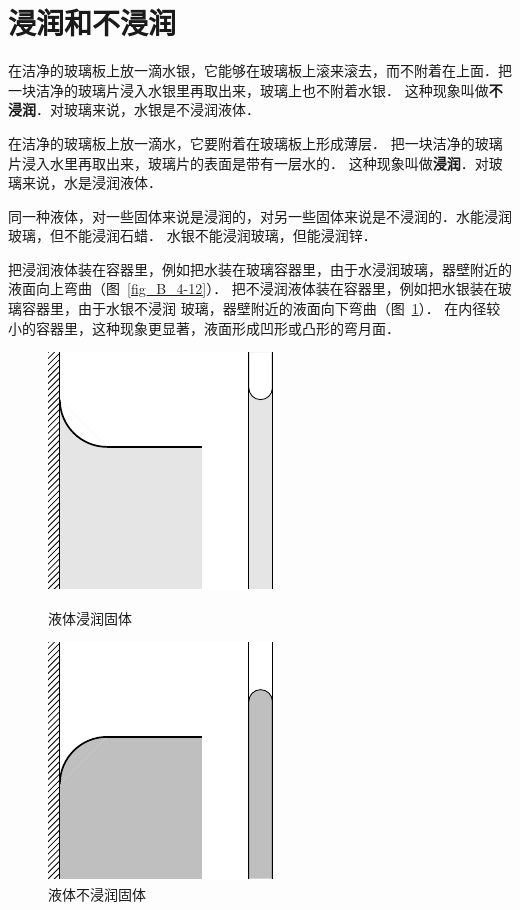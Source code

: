 \section{浸润和不浸润}
在洁净的玻璃板上放一滴水银，它能够在玻璃板上滚来滚去，而不附着在上面．把一块洁净的玻璃片浸入水银里再取出来，玻璃上也不附着水银．
这种现象叫做\textbf{不浸润}．对玻璃来说，水银是不浸润液体．

在洁净的玻璃板上放一滴水，它要附着在玻璃板上形成薄层．
把一块洁净的玻璃片浸入水里再取出来，玻璃片的表面是带有一层水的．
这种现象叫做\textbf{浸润}．对玻璃来说，水是浸润液体．

同一种液体，对一些固体来说是浸润的，对另一些固体来说是不浸润的．水能浸润玻璃，但不能浸润石蜡．
水银不能浸润玻璃，但能浸润锌．

把浸润液体装在容器里，例如把水装在玻璃容器里，由于水浸润玻璃，器壁附近的液面向上弯曲（图~\ref{fig_B_4-12}）．
把不浸润液体装在容器里，例如把水银装在玻璃容器里，由于水银不浸润
玻璃，器壁附近的液面向下弯曲（图~\ref{fig_B_4-13}）．
在内径较小的容器里，这种现象更显著，液面形成凹形或凸形的弯月面．

\begin{figure}[htbp]
    \centering
    \begin{minipage}[t]{0.48\textwidth}
        \centering
        \includegraphics{fig/B/4-12.pdf}
        \caption{液体浸润固体}\label{fig_B_4-12}
    \end{minipage}
    \hfil
    \begin{minipage}[t]{0.48\textwidth}
        \centering
        \includegraphics{fig/B/4-13.pdf}
        \caption{液体不浸润固体}\label{fig_B_4-13}
    \end{minipage}
\end{figure}

